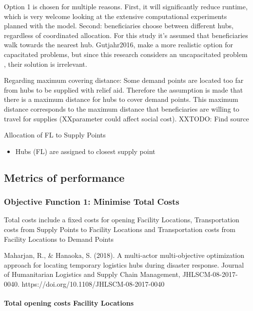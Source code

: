\documentclass[11pt]{article}
\providecommand{\tightlist}{%
      \setlength{\itemsep}{0pt}\setlength{\parskip}{0pt}}
\begin{document}
Option 1 is chosen for multiple reasons. First, it will significantly
reduce runtime, which is very welcome looking at the extensive
computational experiments planned with the model. Second: beneficiaries
choose between different hubs, regardless of coordinated allocation. For
this study it's assumed that beneficiaries walk towards the nearest hub.
Gutjahr2016, make a more realistic option for capacitated problems, but
since this research considers an uncapacitated problem , their solution
is irrelevant.

Regarding maximum covering distance: Some demand points are located too
far from hubs to be supplied with relief aid. Therefore the assumption
is made that there is a maximum distance for hubs to cover demand
points. This maximum distance corresponds to the maximum distance that
beneficiaries are willing to travel for supplies (XXparameter could
affect social cost). XXTODO: Find source

Allocation of FL to Supply Points

\begin{itemize}
\tightlist
\item
  Hubs (FL) are assigned to closest supply point
\end{itemize}

    \subsection{Metrics of performance}\label{metrics-of-performance}

    \subsubsection{Objective Function 1: Minimise Total
Costs}\label{objective-function-1-minimise-total-costs}

Total costs include a fixed costs for opening Facility Locations,
Transportation costs from Supply Points to Facility Locations and
Transportation costs from Facility Locations to Demand Points

Maharjan, R., \& Hanaoka, S. (2018). A multi-actor multi-objective
optimization approach for locating temporary logistics hubs during
disaster response. Journal of Humanitarian Logistics and Supply Chain
Management, JHLSCM-08-2017-0040.
https://doi.org/10.1108/JHLSCM-08-2017-0040

    \paragraph{Total opening costs Facility
Locations}\label{total-opening-costs-facility-locations}
\end{document}
